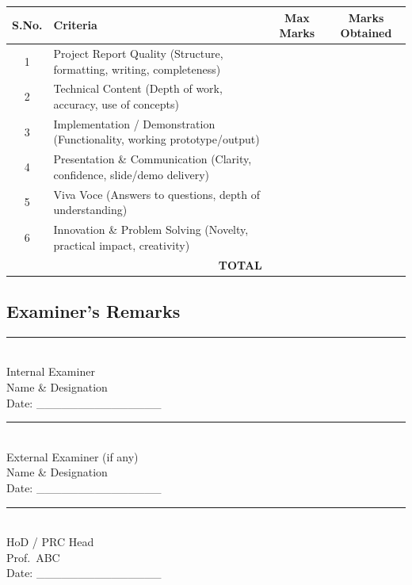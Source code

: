 \documentclass[12pt,a4paper]{report}
\newcommand{\hodname}{Prof.\ ABC}
\numberwithin{equation}{chapter}
\begin{document}
\begin{tabularx}{\textwidth}{|c|X|c|c|}
\hline
\textbf{S.No.} & \textbf{Criteria} & \textbf{Max Marks} & \textbf{Marks Obtained} \\
\hline
1 & Project Report Quality (Structure, formatting, writing, completeness) & & \\ \hline
2 & Technical Content (Depth of work, accuracy, use of concepts) & & \\ \hline
3 & Implementation / Demonstration (Functionality, working prototype/output) & & \\ \hline
4 & Presentation \& Communication (Clarity, confidence, slide/demo delivery) & & \\ \hline
5 & Viva Voce (Answers to questions, depth of understanding) & & \\ \hline
6 & Innovation \& Problem Solving (Novelty, practical impact, creativity) & & \\ \hline
\multicolumn{2}{|r|}{\textbf{TOTAL}} & & \\ \hline
\end{tabularx}

\vspace{0.8cm}

\subsection*{Examiner's Remarks}

\vspace{1.5cm}

\noindent
\begin{minipage}[t]{0.3\textwidth}
\centering
\rule{4cm}{0.4pt}\\
Internal Examiner\\
Name \& Designation\\
Date: \_\_\_\_\_\_\_\_\_\_\_\_\_\_\_
\end{minipage}
\hfill
\begin{minipage}[t]{0.3\textwidth}
\centering
\rule{4cm}{0.4pt}\\
External Examiner (if any)\\
Name \& Designation\\
Date: \_\_\_\_\_\_\_\_\_\_\_\_\_\_\_
\end{minipage}
\hfill
\begin{minipage}[t]{0.3\textwidth}
\centering
\rule{4cm}{0.4pt}\\
HoD / PRC Head\\
\hodname\\
Date: \_\_\_\_\_\_\_\_\_\_\_\_\_\_\_
\end{minipage}
\end{document}
